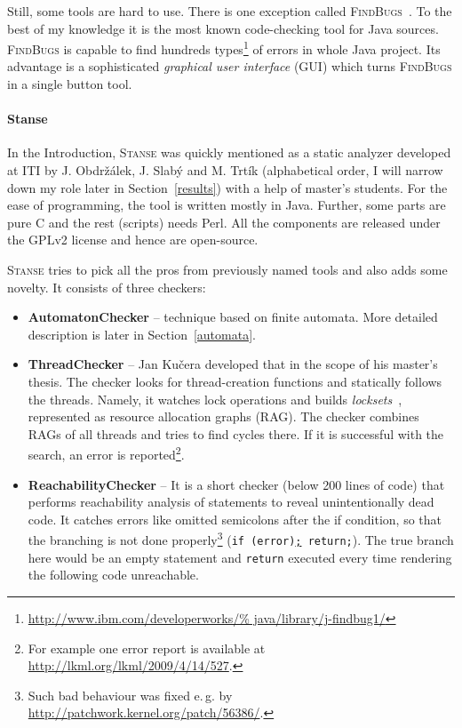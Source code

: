 \documentclass[11pt,a4paper]{article}
\newcommand{\stan}{\textsc{Stanse}\xspace}
\begin{document}
Still, some tools are hard to use. There is one exception called
\textsc{FindBugs}~\cite{findbugs}. To the best of my knowledge it is the most
known code-checking tool for Java sources. \textsc{FindBugs} is capable to
find hundreds types\footnote{\url{http://www.ibm.com/developerworks/%
java/library/j-findbug1/}} of errors in whole Java project. Its advantage is a
sophisticated \emph{graphical user interface} (GUI) which turns
\textsc{FindBugs} in a single button tool.

\paragraph{Stanse}\label{stanse} In the Introduction, \stan was quickly
mentioned as a static analyzer developed at ITI by J. Obdržálek, J.  Slabý and
M. Trtík (alphabetical order, I will narrow down my role later in
Section~\ref{results}) with a help of master's students. For the ease of
programming, the tool is written mostly in Java. Further, some parts are pure
C and the rest (scripts) needs Perl. All the components are released under the
GPLv2 license and hence are open-source.

\stan tries to pick all the pros from previously named tools and also adds
some novelty. It consists of three checkers:
\begin{itemize}
\item \textbf{AutomatonChecker} -- technique based on finite automata. More
detailed description is later in Section~\ref{automata}.
\item \textbf{ThreadChecker} -- Jan Kučera developed that in the scope of his
master's thesis. The checker looks for thread-creation functions and statically
follows the threads. Namely, it watches lock operations and builds
\emph{locksets}~\cite{lockset}, represented as resource allocation graphs
(RAG). The checker combines RAGs of all threads and tries to find cycles
there. If it is successful with the search, an error is reported\footnote{For
example one error report is available at
\url{http://lkml.org/lkml/2009/4/14/527}.}.
\item \textbf{ReachabilityChecker} -- It is a short checker (below 200 lines
of code) that performs reachability analysis of statements to reveal
unintentionally dead code. It catches errors like omitted semicolons after the
if condition, so that the branching is not done properly\footnote{Such bad
behaviour was fixed e.\,g. by \url{http://patchwork.kernel.org/patch/56386/}.}
(\texttt{if (error)\underline{;} return;}). The true branch here would
be an empty statement and \texttt{return} executed every time rendering the
following code unreachable.
\end{itemize}
\end{document}
